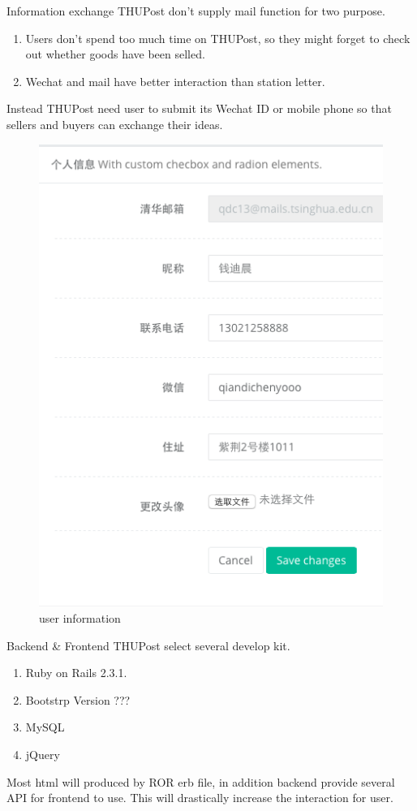 \documentclass[final]{beamer}
\newlength{\onecolwid}
\begin{document}
\begin{frame}[t]
\begin{columns}[t]
\begin{column}{\onecolwid}
        \begin{block}{Information exchange}
        THUPost don't supply mail function for two purpose. 
        \begin{enumerate}
        \item Users don't spend too much time on THUPost, so they might forget to check out whether goods have been selled.
        \item Wechat and mail have better interaction than station letter.
        \end{enumerate}

        Instead THUPost need user to submit its Wechat ID or mobile phone so that sellers and buyers can exchange their ideas.


        \end{block}

        \begin{figure}
        \includegraphics[width=0.4\linewidth]{information.png}
        \caption{user information}
        \end{figure}


        \begin{block}{Backend \& Frontend}
        THUPost select several develop kit.
        \begin{enumerate}
        \item Ruby on Rails 2.3.1.
        \item Bootstrp Version ???
        \item MySQL
        \item jQuery
        \end{enumerate}

        Most html will produced by ROR erb file, in addition backend provide several API for frontend to use. This will drastically increase the interaction for user.


\end{block}
\end{column}
\end{columns}
\end{frame}
\end{document}
